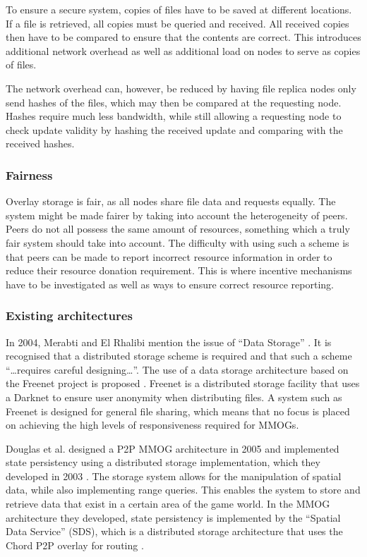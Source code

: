 \documentclass[10pt,a4paper,journal,cspaper,compsoc]{IEEEtran}
\begin{document}
To ensure a secure system, copies of files have to be saved at different locations. If a file is retrieved, all copies must be queried and received.
All received copies then have to be compared to ensure that the contents are correct. This introduces additional network overhead as well as
additional load on nodes to serve as copies of files.

The network overhead can, however, be reduced by having file replica nodes only send hashes of the files, which may then be compared at the
requesting node. Hashes require much less bandwidth, while still allowing a requesting node to check update validity by hashing the received update
and comparing with the received hashes.

\subsubsection{Fairness}

Overlay storage is fair, as all nodes share file data and requests equally. The system might be made fairer by taking into account the heterogeneity
of peers. Peers do not all possess the same amount of resources, something which a truly fair system should take into account. The difficulty with
using such a scheme is that peers can be made to report incorrect resource information in order to reduce their resource donation requirement. This
is where incentive mechanisms have to be investigated as well as ways to ensure correct resource reporting.

\subsubsection{Existing architectures}

In 2004, Merabti and El Rhalibi mention the issue of ``Data Storage'' \cite{using_freenet_storage}. It is recognised that a distributed storage
scheme is required and that such a scheme ``\ldots requires careful designing\ldots''. The use of a data storage architecture based on the Freenet
project is proposed \cite{clarke_freenet}. Freenet is a distributed storage facility that uses a Darknet to ensure user anonymity when distributing
files. A system such as Freenet is designed for general file sharing, which means that no focus is placed on achieving the high levels of
responsiveness required for MMOGs.

Douglas et al. designed a P2P MMOG architecture in 2005 \cite{Douglas05enablingmassively} and implemented state persistency using a distributed
storage implementation, which they developed in 2003 \cite{Harwood03hashingspatial}. The storage system allows for the manipulation of spatial data,
while also implementing range queries. This enables the system to store and retrieve data that exist in a certain area of the game world. In the MMOG
architecture they developed, state persistency is implemented by the ``Spatial Data Service'' (SDS), which is a distributed storage architecture that
uses the Chord P2P overlay for routing \cite{chord}.
\end{document}
